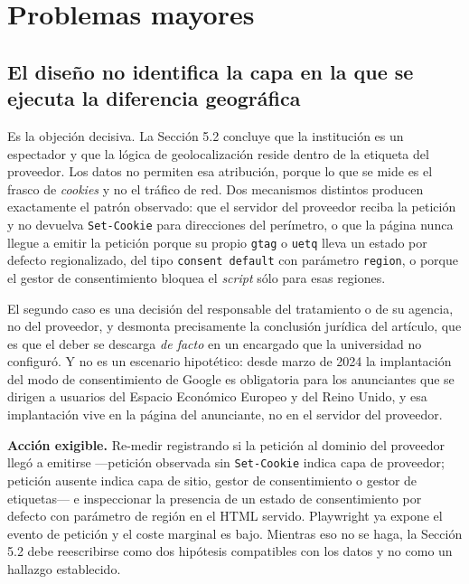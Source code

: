 \documentclass[11pt,a4paper]{article}
\begin{document}
\section{Problemas mayores}

\subsection{El dise\~no no identifica la capa en la que se ejecuta la diferencia geogr\'afica}

Es la objeci\'on decisiva. La Secci\'on 5.2 concluye que la instituci\'on es un espectador y que la l\'ogica de geolocalizaci\'on reside dentro de la etiqueta del proveedor. Los datos no permiten esa atribuci\'on, porque lo que se mide es el frasco de \emph{cookies} y no el tr\'afico de red. Dos mecanismos distintos producen exactamente el patr\'on observado: que el servidor del proveedor reciba la petici\'on y no devuelva \texttt{Set-Cookie} para direcciones del per\'imetro, o que la p\'agina nunca llegue a emitir la petici\'on porque su propio \texttt{gtag} o \texttt{uetq} lleva un estado por defecto regionalizado, del tipo \texttt{consent default} con par\'ametro \texttt{region}, o porque el gestor de consentimiento bloquea el \emph{script} s\'olo para esas regiones.

El segundo caso es una decisi\'on del responsable del tratamiento o de su agencia, no del proveedor, y desmonta precisamente la conclusi\'on jur\'idica del art\'iculo, que es que el deber se descarga \emph{de facto} en un encargado que la universidad no configur\'o. Y no es un escenario hipot\'etico: desde marzo de 2024 la implantaci\'on del modo de consentimiento de Google es obligatoria para los anunciantes que se dirigen a usuarios del Espacio Econ\'omico Europeo y del Reino Unido, y esa implantaci\'on vive en la p\'agina del anunciante, no en el servidor del proveedor.

\textbf{Acci\'on exigible.} Re-medir registrando si la petici\'on al dominio del proveedor lleg\'o a emitirse ---petici\'on observada sin \texttt{Set-Cookie} indica capa de proveedor; petici\'on ausente indica capa de sitio, gestor de consentimiento o gestor de etiquetas--- e inspeccionar la presencia de un estado de consentimiento por defecto con par\'ametro de regi\'on en el HTML servido. Playwright ya expone el evento de petici\'on y el coste marginal es bajo. Mientras eso no se haga, la Secci\'on 5.2 debe reescribirse como dos hip\'otesis compatibles con los datos y no como un hallazgo establecido.
\end{document}
